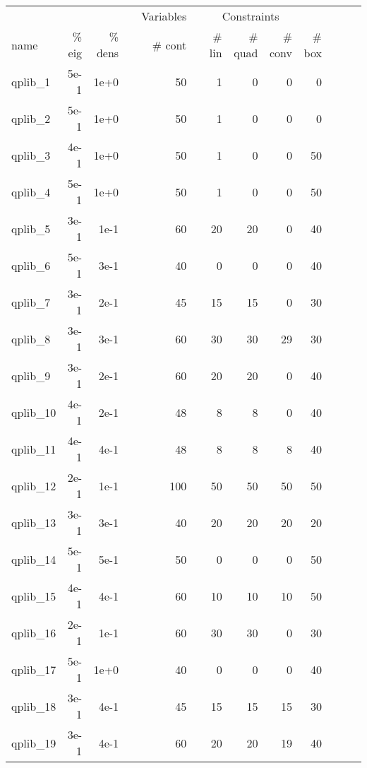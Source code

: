 \begin{table}
 \centering
 \setlength{\tabcolsep}{11pt}
 \renewcommand \arraystretch{1}
\begin{tabular}{lrrrrrrrrrrrr}
\toprule

			&		&		&	&	\multicolumn{1}{c}{Variables}	&	&	\multicolumn{3}{c}{Constraints}							\\
\cmidrule(lr){5-5} \cmidrule(lr){7-10}																	
name	&	\% eig	&	\% dens	&	&	\# cont 	&	&	\# lin 	&	\# quad 	&	\# conv 	&	\# box	\\
\cmidrule(lr){5-5} \cmidrule(lr){7-10}																	

qplib\_1	&	5e-1	&	1e+0	&	&	50	&	&	1	&	0	&	0	&	0	\\
qplib\_2	&	5e-1	&	1e+0	&	&	50	&	&	1	&	0	&	0	&	0	\\
qplib\_3	&	4e-1	&	1e+0	&	&	50	&	&	1	&	0	&	0	&	50	\\
qplib\_4	&	5e-1	&	1e+0	&	&	50	&	&	1	&	0	&	0	&	50	\\
qplib\_5	&	3e-1	&	1e-1	&	&	60	&	&	20	&	20	&	0	&	40	\\
qplib\_6	&	5e-1	&	3e-1	&	&	40	&	&	0	&	0	&	0	&	40	\\
qplib\_7	&	3e-1	&	2e-1	&	&	45	&	&	15	&	15	&	0	&	30	\\
qplib\_8	&	3e-1	&	3e-1	&	&	60	&	&	30	&	30	&	29	&	30	\\
qplib\_9	&	3e-1	&	2e-1	&	&	60	&	&	20	&	20	&	0	&	40	\\
qplib\_10	&	4e-1	&	2e-1	&	&	48	&	&	8	&	8	&	0	&	40	\\
qplib\_11	&	4e-1	&	4e-1	&	&	48	&	&	8	&	8	&	8	&	40	\\
qplib\_12	&	2e-1	&	1e-1	&	&	100	&	&	50	&	50	&	50	&	50	\\
qplib\_13	&	3e-1	&	3e-1	&	&	40	&	&	20	&	20	&	20	&	20	\\
qplib\_14	&	5e-1	&	5e-1	&	&	50	&	&	0	&	0	&	0	&	50	\\
qplib\_15	&	4e-1	&	4e-1	&	&	60	&	&	10	&	10	&	10	&	50	\\
qplib\_16	&	2e-1	&	1e-1	&	&	60	&	&	30	&	30	&	0	&	30	\\
qplib\_17	&	5e-1	&	1e+0	&	&	40	&	&	0	&	0	&	0	&	40	\\
qplib\_18	&	3e-1	&	4e-1	&	&	45	&	&	15	&	15	&	15	&	30	\\
qplib\_19	&	3e-1	&	4e-1	&	&	60	&	&	20	&	20	&	19	&	40	\\

\end{tabular}
\end{table}
